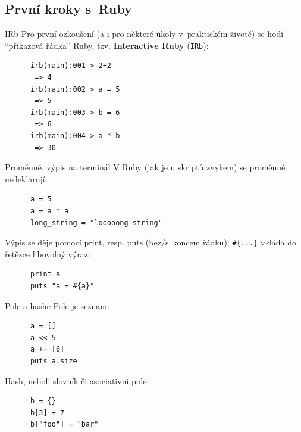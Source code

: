 \documentclass{beamer}
\begin{document}
\subsection{První kroky s~Ruby}

\begin{frame}[fragile]{IRb}
  Pro první ozkoušení (a i pro některé úkoly v~praktickém životě) se hodí ``příkazová řádka'' Ruby, tzv. \textbf{Interactive Ruby} (\texttt{IRb}):
  \pause
  \begin{block}{}
    {\scriptsize \begin{verbatim}
      irb(main):001 > 2+2
       => 4
      irb(main):002 > a = 5
       => 5
      irb(main):003 > b = 6
       => 6
      irb(main):004 > a * b
       => 30
    \end{verbatim}}
  \end{block}

\end{frame}

\begin{frame}[fragile]{Proměnné, výpis na terminál}
  V Ruby (jak je u skriptů zvykem) se proměnné nedeklarují:
  \begin{block}{}
    {\scriptsize \begin{verbatim}
      a = 5
      a = a * a
      long_string = "looooong string"
    \end{verbatim}}
  \end{block}
  \pause
  Výpis se děje pomocí print, resp. puts (bez/s~koncem řádku); \texttt{\#\{...\}} vkládá do řetězce libovolný výraz:
  \begin{block}{}
    {\scriptsize \begin{verbatim}
      print a
      puts "a = #{a}"
    \end{verbatim}}
  \end{block}
\end{frame}

\begin{frame}[fragile]{Pole a hashe}
  Pole je seznam:
  \begin{block}{}
    {\scriptsize \begin{verbatim}
      a = []
      a << 5
      a += [6]
      puts a.size
    \end{verbatim}}
  \end{block}
  \pause
  Hash, neboli slovník či asociativní pole:
  \begin{block}{}
    {\scriptsize \begin{verbatim}
      b = {}
      b[3] = 7
      b["foo"] = "bar"
    \end{verbatim}}
  \end{block}
\end{frame}
\end{document}
